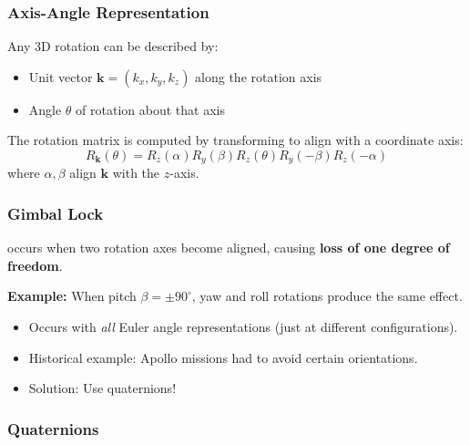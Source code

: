 \separator

\subsubsection{Axis-Angle Representation}

\begin{defbox}
Any 3D rotation can be described by:
\begin{itemize}
  \item Unit vector $\mathbf{k} = (k_x, k_y, k_z)$ along the rotation axis
  \item Angle $\theta$ of rotation about that axis
\end{itemize}
The rotation matrix is computed by transforming to align with a coordinate axis:
\[
R_{\mathbf{k}}(\theta) = R_z(\alpha) R_y(\beta) R_z(\theta) R_y(-\beta) R_z(-\alpha)
\]
where $\alpha, \beta$ align $\mathbf{k}$ with the $z$-axis.
\end{defbox}

\separator

\subsubsection{Gimbal Lock}

\begin{defbox}
 occurs when two rotation axes become aligned, causing \textbf{loss of one degree of freedom}.

\textbf{Example:} When pitch $\beta = \pm 90^\circ$, yaw and roll rotations produce the same effect.
\end{defbox}

\begin{tipbox}
\begin{itemize}
  \item Occurs with \emph{all} Euler angle representations (just at different configurations).
  \item Historical example: Apollo missions had to avoid certain orientations.
  \item Solution: Use quaternions!
\end{itemize}
\end{tipbox}

\separator

\subsubsection{Quaternions}

